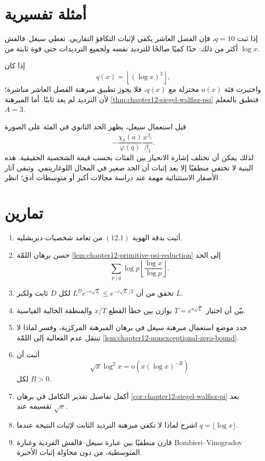 \section{أمثلة تفسيرية}

\begin{example}
إذا ثبت \(q=10\)، فإن الفصل العاشر يكفي لإثبات التكافؤ التقاربي. تعطي
سيغل--فالفش أكثر من ذلك: حدًا كميًا صالحًا للترديد نفسه ولجميع الترديدات
حتى قوة ثابتة من \(\log x\).
\end{example}

\begin{example}
إذا كان
\[
q(x)=\left\lfloor(\log x)^3\right\rfloor,
\]
واختيرت فئة \(a(x)\) مختزلة مع \(q(x)\)، فلا يجوز تطبيق مبرهنة الفصل
العاشر مباشرة؛ لأن الترديد لم يعد ثابتًا. أما المبرهنة
\ref{thm:chapter12-siegel-walfisz-psi} فتطبق بالمعلم \(A=3\).
\end{example}

\begin{example}
قبل استعمال سيغل، يظهر الحد الثانوي في الفئة على الصورة
\[
-\frac{\overline{\chi_1(a)}}{\varphi(q)}
\frac{x^{\beta_1}}{\beta_1}.
\]
لذلك يمكن أن تختلف إشارة الانحياز بين الفئات بحسب قيمة الشخصية الحقيقية.
هذه البنية لا تختفي منطقيًا إلا بعد إثبات أن الحد صغير في المجال
اللوغاريتمي. وتبقى آثار الأصفار الاستثنائية مهمة عند دراسة مجالات أكبر أو
متوسطات أدق؛ انظر \cite{DrappeauFiorilli2021,ThornerZaman2024}.
\end{example}

\section{تمارين}

\begin{enumerate}
  \item أثبت بدقة الهوية \((12.1)\) من تعامد شخصيات ديريشليه.
  \item حسن برهان اللمّة \ref{lem:chapter12-primitive-psi-reduction} إلى
  الحد
  \[
  \sum_{p\mid q}\log p\left\lfloor\frac{\log x}{\log p}\right\rfloor.
  \]
  \item تحقق من أن \(L^D e^{-c\sqrt L}\le e^{-c\sqrt L/2}\) لكل \(D\)
  ثابت ولكبر \(L\).
  \item بيّن أن اختيار \(T=e^{\kappa\sqrt L}\) يوازن بين خطأ القطع
  \(x/T\) والمنطقة الخالية القياسية.
  \item حدد موضع استعمال مبرهنة سيغل في برهان المبرهنة المركزية، وفسر لماذا
  لا تنتقل عدم الفعالية إلى اللمّة \ref{lem:chapter12-nonexceptional-zero-bound}.
  \item أثبت أن
  \[
  \sqrt x\log^2x=o\!\left(x(\log x)^{-B}\right)
  \]
  لكل \(B>0\).
  \item أكمل تفاصيل تقدير التكامل في برهان
  \ref{cor:chapter12-siegel-walfisz-pi} بعد تقسيمه عند \(\sqrt x\).
  \item اشرح لماذا لا تكفي مبرهنة الترديد الثابت لإثبات النتيجة عندما
  \(q=\lfloor\log x\rfloor\).
  \item قارن منطقيًا بين عبارة سيغل--فالفش الفردية وعبارة
  Bombieri--Vinogradov المتوسطية، من دون محاولة إثبات الأخيرة.
\end{enumerate}

